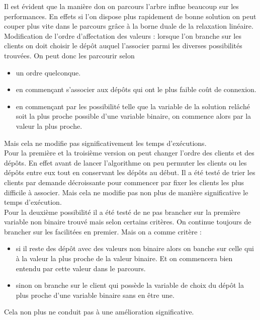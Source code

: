 \documentclass[12pt,a4paper]{article}
\begin{document}
Il est évident que la manière don on parcours l'arbre influe beaucoup sur les performances. En effets si l'on dispose plus rapidement de bonne solution on peut couper plus vite dans le parcours grâce à la borne duale de la relaxation linéaire.\\

Modification de l'ordre d'affectation des valeurs : lorsque l'on branche sur les clients on doit choisir le dépôt auquel l'associer parmi les diverses possibilités trouvées. On peut donc les parcourir selon
\begin{itemize}
\item
un ordre quelconque.
\item
en commençant s'associer aux dépôts qui ont le plus faible coût de connexion.
\item
en commençant par les possibilité telle que la variable de la solution relâché soit la plus proche possible d'une variable binaire, on commence alors par la valeur la plus proche.
\end{itemize}
Mais cela ne modifie pas significativement les temps d’exécutions.\\

Pour la première et la troisième version on peut changer l'ordre des clients et des dépôts. En effet avant de lancer l'algorithme on peu permuter les clients ou les dépôts entre eux tout en conservant les dépôts au début. Il a été testé de trier les clients par demande décroissante pour commencer par fixer les clients les plus difficile à associer. Mais cela ne modifie pas non plus de manière significative le temps d’exécution.\\

Pour la deuxième possibilité il a été testé de ne pas brancher sur la première variable non binaire trouvé mais selon certains critères. On continue toujours de brancher sur les facilitées en premier. Mais on a comme critère :
\begin{itemize}
\item
si il reste des dépôt avec des valeurs non binaire alors on banche sur celle qui à la valeur la plus proche de la valeur binaire. Et on commencera bien entendu par cette valeur dans le parcours.
\item
sinon on branche sur le client qui possède la variable de choix du dépôt la plus proche d'une variable binaire sans en être une.
\end{itemize}
Cela non plus ne conduit pas à une amélioration significative.\\
\end{document}
